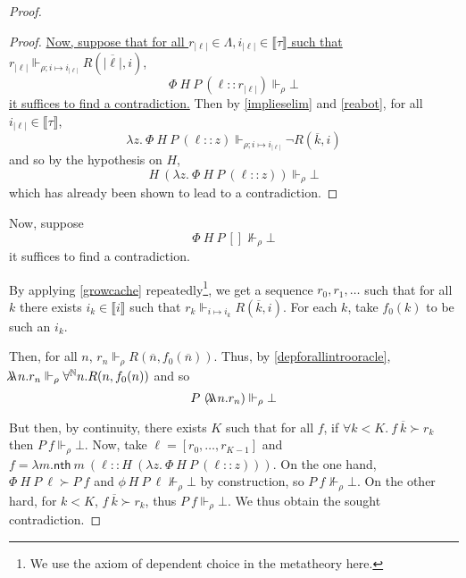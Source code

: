 \documentclass{article}
\newcommand{\N}{\mathbb{N}}
\newcommand{\depforall}[1]{\forall^\N #1.}
\newcommand{\realizes}{\Vdash}
\newcommand{\oracle}[2]{\lambda\mkern-15mu\lambda\ #1. #2}
\newcommand{\typeinterp}[1]{{\llbracket #1 \rrbracket}}
\newcommand{\nth}{\mathsf{nth}}
\newcommand{\length}[1]{{|#1|}}
\begin{document}
\begin{proof}
\begin{proof}
    \ul{Now, suppose that for all $r_\length{\ell} \in \Lambda, i_\length{\ell} \in \typeinterp{\tau}$ such that $r_\length{\ell} \realizes_{\rho; i \mapsto i_\length{\ell}} R(\overline{\length\ell}, i)$},
    \[ \Phi\ H\ P\ (\ell :: r_\length{\ell}) \realizes_\rho \bot \]
    \ul{it suffices to find a contradiction.}
    Then by \cref{implieselim} and \cref{reabot}, for all $i_\length{\ell} \in \typeinterp{\tau}$,
    \[ \lambda z.\ \Phi\ H\ P\ (\ell :: z) \realizes_{\rho; i \mapsto i_\length{\ell}} \neg R(\overline{k}, i) \]
    and so by the hypothesis on $H$,
    \[ H\ (\lambda z.\ \Phi\ H\ P\ (\ell :: z)) \realizes_\rho \bot \]
    which has already been shown to lead to a contradiction.
\end{proof}

Now, suppose
\[ \Phi\ H\ P\ [] \not\realizes_\rho \bot \]
it suffices to find a contradiction.

By applying \cref{growcache} repeatedly\footnote{We use the axiom of dependent choice in the metatheory here.}, we get a sequence $r_0, r_1, \dots$ such that for all $k$ there exists $i_k \in \typeinterp{i}$ such that $r_k \realizes_{i \mapsto i_k} R(\overline{k}, i)$.
For each $k$, take $f_0(k)$ to be such an $i_k$.

Then, for all $n$, $r_n \realizes_\rho R(\overline{n}, f_0(\overline{n}))$.
Thus, by \cref{depforallintrooracle}, $\oracle{n}{r_n} \realizes_\rho \depforall{n} R(n, f_0(n))$ and so \[P\ (\oracle{n}{r_n}) \realizes_\rho \bot\]

But then, by continuity, there exists $K$ such that for all $f$, if $\forall k < K.\ f\ \overline{k} \succ r_k$ then $P\ f \realizes_\rho \bot$.
Now, take $\ell = [r_0, \dots, r_{K-1}]$ and $f = \lambda m. \nth\ m\ (\ell :: H\ (\lambda z. \ \Phi\ H\ P\ (\ell :: z)))$.
On the one hand, $\Phi\ H\ P\ \ell \succ P\ f$ and $\phi\ H\ P\ \ell \not\realizes_\rho \bot$ by construction, so $P\ f \not\realizes_\rho \bot$.
On the other hard, for $k < K$, $f\ \overline{k} \succ r_k$, thus $P\ f \realizes_\rho \bot$.
We thus obtain the sought contradiction.

\end{proof}
\end{document}
